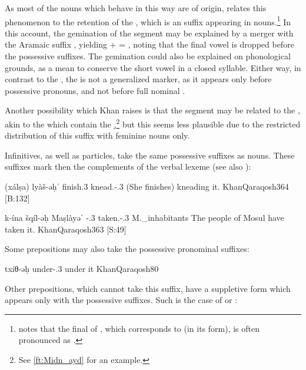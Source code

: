As most of the nouns which behave in this way are of \Arab origin, \citet[206]{KhanQaraqosh} relates this phenomenon to the retention of the  , which is an  suffix appearing in \cst* \fem* nouns.\footnote{\citet[204]{KhanQaraqosh} notes that the final  of  , which corresponds to  (in its \free* form), is often pronounced as \phonetic[ə].}  In this account, the gemination of the  segment may be explained by a merger with the Aramaic \fem* suffix , yielding  +  = , noting that the final  vowel is dropped before the possessive suffixes. The gemination could also be explained on phonological grounds, as a mean to conserve the short \phonetic[ə] vowel in a closed syllable. Either way, in contrast to the \Arab {}, the \Qar {} is not a generalized \fem* \cst* marker, as it  appears only  before possessive pronouns, and not before full nominal \secns. 

Another possibility which Khan raises is that the  segment may be related to the \lnk* {}, akin to the   which contain the \lnk* \d,\footnote{See \vref{ft:Midn_ayd} for an example.} 
but this seems less plausible due to the restricted distribution of this suffix with feminine nouns only. 

Infinitives, as well as particles, take the same possessive suffixes as nouns. These suffixes mark then the complements of the verbal lexeme (see also ):

{(xálṣa) lyàš-əḥˈ}
{finish.3\fem{} knead.\inf-\poss.3\masc}
{(She finishes) kneading it.}
{KhanQaraqosh}{364 {[B:132]}}

{k-ína šqíl-əḥ Maṣlàyəˈ}
{\ind-\cop.3\pl{} taken.\resl-\poss.3\masc{} M.\_inhabitants}
{The people of Mosul have taken it.}
{KhanQaraqosh}{363 {[S:49]}}

Some prepositions may also take the possessive pronominal suffixes:

{txíθ-əḥ}
{under-\poss.3\masc{}}
{under it}
{KhanQaraqosh}{80}

 Other prepositions, which cannot take this suffix, have a suppletive form which appears only with the possessive suffixes. Such is the case of  or :


